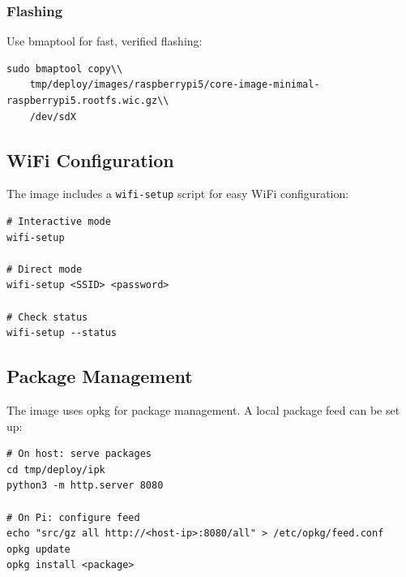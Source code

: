\subsubsection{Flashing}

Use bmaptool for fast, verified flashing:
\begin{verbatim}
sudo bmaptool copy\\
    tmp/deploy/images/raspberrypi5/core-image-minimal-raspberrypi5.rootfs.wic.gz\\
    /dev/sdX
\end{verbatim}

\subsection{WiFi Configuration}

The image includes a \texttt{wifi-setup} script for easy WiFi configuration:

\begin{verbatim}
# Interactive mode
wifi-setup

# Direct mode
wifi-setup <SSID> <password>

# Check status
wifi-setup --status
\end{verbatim}

\subsection{Package Management}

The image uses opkg for package management. A local package feed can be set up:

\begin{verbatim}
# On host: serve packages
cd tmp/deploy/ipk
python3 -m http.server 8080

# On Pi: configure feed
echo "src/gz all http://<host-ip>:8080/all" > /etc/opkg/feed.conf
opkg update
opkg install <package>
\end{verbatim}
